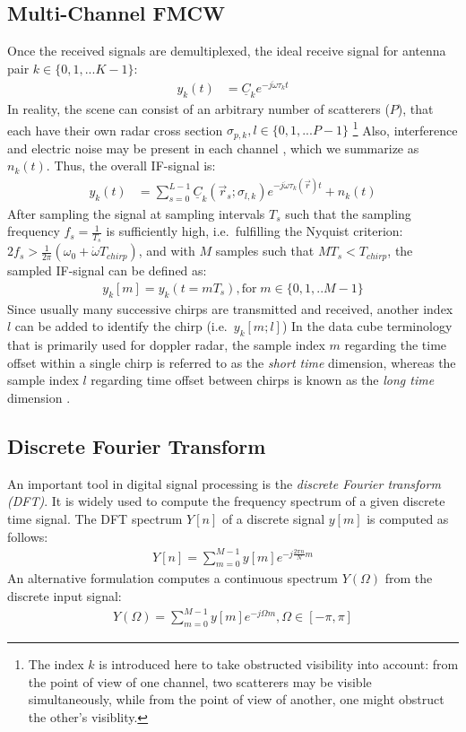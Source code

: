 \subsection{Multi-Channel FMCW}
Once the received signals are demultiplexed, the ideal receive signal for antenna pair $k \in \{0,1,...K-1\}$:
\begin{align}
    y_k(t) & = \underline C_k e^{-j\dot\omega\tau_k t} \label{eq:ideal_scatterer}
\end{align}
In reality, the scene can consist of an arbitrary number of scatterers ($P$),
that each have their own radar cross section $\sigma_{p,k}, l \in \{0,1,...P-1\}$
\footnote{
    The index $k$ is introduced here to take obstructed visibility into account:
    from the point of view of one channel, two scatterers may be visible simultaneously,
    while from the point of view of another, one might obstruct the other's visiblity.
}
Also, interference and electric noise may be present in each channel \parencite[see][ch. 4]{jankiraman},
which we summarize as $n_k(t)$. Thus, the overall IF-signal is:
\begin{align}
    y_k(t) & = \sum_{s=0}^{L-1} \underline C_k(\vec r_s; \sigma_{l,k}) e^{-j\dot\omega\tau_k(\vec r)t} + n_k(t)
\end{align}
After sampling the signal at sampling intervals $T_s$ such that the sampling frequency $f_s = \frac{1}{T_s}$
is sufficiently high, i.e.\ fulfilling the Nyquist criterion:
${2f_s > \frac{1}{2\pi}(\omega_0 + \dot \omega T_{chirp})}$, and with $M$ samples such that $MT_s < T_{chirp}$,
the sampled IF-signal can be defined as:
\begin{align}
    y_k[m] = y_k(t=mT_s), \text{for}\;m \in \{0,1,..M-1\}
\end{align}
Since usually many successive chirps are transmitted and received,
another index $l$ can be added to identify the chirp (i.e.\ $y_{k}[m;l]$)
In the data cube terminology that is primarily used for doppler radar,
the sample index $m$ regarding the time offset within a single chirp
is referred to as the \emph{short time} dimension,
whereas the sample index $l$ regarding time offset between chirps
is known as the \emph{long time} dimension \parencite[see][pp. 290f.]{richards}.

\subsection{Discrete Fourier Transform}
An important tool in digital signal processing is the \emph{discrete Fourier transform (DFT)}.
It is widely used to compute the frequency spectrum of a given discrete time signal.
The DFT spectrum $Y[n]$ of a discrete signal $y[m]$ is computed as follows:
\begin{align}
    Y[n] = \sum_{m=0}^{M-1}y[m]e^{-j\frac{2\pi n}{N}m}
\end{align}
An alternative formulation computes a continuous spectrum $Y(\Omega)$
from the discrete input signal:
\begin{align}
    Y(\Omega) = \sum_{m=0}^{M-1}y[m]e^{-j\Omega m}, \Omega \in [-\pi, \pi]
\end{align}

